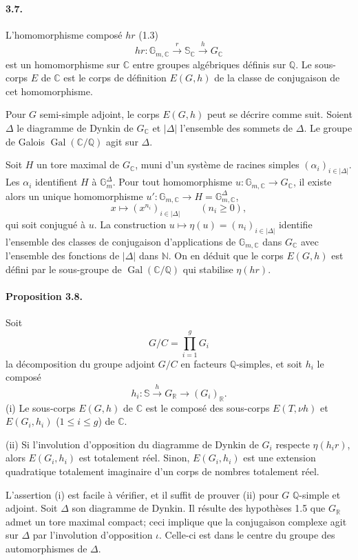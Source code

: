 \documentclass[10pt]{article}
\newcommand{\C}{\mathbb C}
\newcommand{\Gm}{\mathbb G_m}
\newcommand{\Q}{\mathbb Q}
\newcommand{\R}{\mathbb R}
\newcommand{\bS}{\mathbb S}
\newcommand{\Gal}{\operatorname{Gal}}
\begin{document}
\paragraph{3.7.} L'homomorphisme composé $hr$ (1.3)
\[
hr:\mathbb G_{m,\C}\xrightarrow{r}\bS_\C\xrightarrow{h}G_\C
\]
est un homomorphisme sur $\C$ entre groupes algébriques définis sur $\Q$. Le sous-corps $E$ de $\C$ est le corps de définition $E(G,h)$ de la classe de conjugaison de cet homomorphisme.

Pour $G$ semi-simple adjoint, le corps $E(G,h)$ peut se décrire comme suit. Soient $\Delta$ le diagramme de Dynkin de $G_\C$ et $|\Delta|$ l'ensemble des sommets de $\Delta$. Le groupe de Galois $\Gal(\C/\Q)$ agit sur $\Delta$.

Soit $H$ un tore maximal de $G_\C$, muni d'un système de racines simples $(\alpha_i)_{i\in |\Delta|}$. Les $\alpha_i$ identifient $H$ à $\Gm^{\Delta}$. Pour tout homomorphisme $u:\mathbb G_{m,\C}\to G_\C$, il existe alors un unique homomorphisme $u':\mathbb G_{m,\C}\to H=\mathbb G_{m,\C}^{\Delta}$,
\[
x\longmapsto (x^{n_i})_{i\in |\Delta|}\qquad(n_i\ge0),
\]
qui soit conjugué à $u$. La construction $u\mapsto \eta(u)=(n_i)_{i\in |\Delta|}$ identifie l'ensemble des classes de conjugaison d'applications de $\mathbb G_{m,\C}$ dans $G_\C$ avec l'ensemble des fonctions de $|\Delta|$ dans $\mathbb N$. On en déduit que le corps $E(G,h)$ est défini par le sous-groupe de $\Gal(\C/\Q)$ qui stabilise $\eta(hr)$.

\paragraph{Proposition 3.8.} Soit
\[
G/C=\prod_{i=1}^g G_i
\]
la décomposition du groupe adjoint $G/C$ en facteurs $\Q$-simples, et soit $h_i$ le composé
\[
h_i:\bS\xrightarrow{h}G_\R\longrightarrow (G_i)_\R.
\]
(i) Le sous-corps $E(G,h)$ de $\C$ est le composé des sous-corps $E(T,\nu h)$ et $E(G_i,h_i)$ ($1\le i\le g$) de $\C$.

(ii) Si l'involution d'opposition du diagramme de Dynkin de $G_i$ respecte $\eta(h_ir)$, alors $E(G_i,h_i)$ est totalement réel. Sinon, $E(G_i,h_i)$ est une extension quadratique totalement imaginaire d'un corps de nombres totalement réel.

L'assertion (i) est facile à vérifier, et il suffit de prouver (ii) pour $G$ $\Q$-simple et adjoint. Soit $\Delta$ son diagramme de Dynkin. Il résulte des hypothèses 1.5 que $G_\R$ admet un tore maximal compact; ceci implique que la conjugaison complexe agit sur $\Delta$ par l'involution d'opposition $\iota$. Celle-ci est dans le centre du groupe des automorphismes de $\Delta$.
\end{document}

